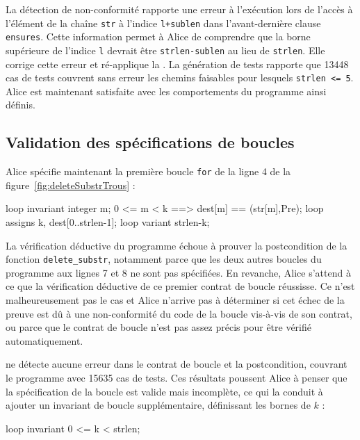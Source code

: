 La détection de non-conformité rapporte une erreur à l'exécution lors de l'accès
à l'élément de la chaîne \lstinline{str} à l'indice \lstinline{l+sublen} dans
l'avant-dernière clause \lstinline{ensures}.
Cette information permet à Alice de comprendre que la borne supérieure de
l'indice \lstinline'l' devrait être \lstinline{strlen-sublen} au lieu de
\lstinline{strlen}.
Elle corrige cette erreur et ré-applique la \NCD.
La génération de tests rapporte que 13448 cas de tests couvrent sans erreur les
chemins faisables pour lesquels \lstinline{strlen <= 5}.
Alice est maintenant satisfaite avec les comportements du programme ainsi
définis.


\subsection{Validation des spécifications de boucles}
\label{sec:ncd-incr}


Alice spécifie maintenant la première boucle \lstinline'for' de la ligne 4 de la
figure~\ref{fig:deleteSubstrTrous} :

\begin{pretty-codeACSL}
loop invariant \forall integer m; 0 <= m < k ==> dest[m] == \at(str[m],Pre);
loop assigns k, dest[0..strlen-1];
loop variant strlen-k;
\end{pretty-codeACSL}

La vérification déductive du programme échoue à prouver la postcondition de la
fonction \lstinline{delete_substr}, notamment parce que les deux autres boucles
du programme aux lignes 7 et 8 ne sont pas spécifiées.
En revanche, Alice s'attend à ce que la vérification déductive de ce premier
contrat de boucle réussisse.
Ce n'est malheureusement pas le cas et Alice n'arrive pas à déterminer si cet
échec de la preuve est dû à une non-conformité du code de la boucle vis-à-vis de
son contrat, ou parce que le contrat de boucle n'est pas assez précis pour être
vérifié automatiquement.

\NCD ne détecte aucune erreur dans le contrat de boucle et la postcondition,
couvrant le programme avec 15635 cas de tests.
Ces résultats poussent Alice à penser que la spécification de la boucle est
valide mais incomplète, ce qui la conduit à ajouter un invariant de boucle
supplémentaire, définissant les bornes de $k$ : 

\begin{pretty-codeACSL}
loop invariant 0 <= k < strlen;
\end{pretty-codeACSL}

